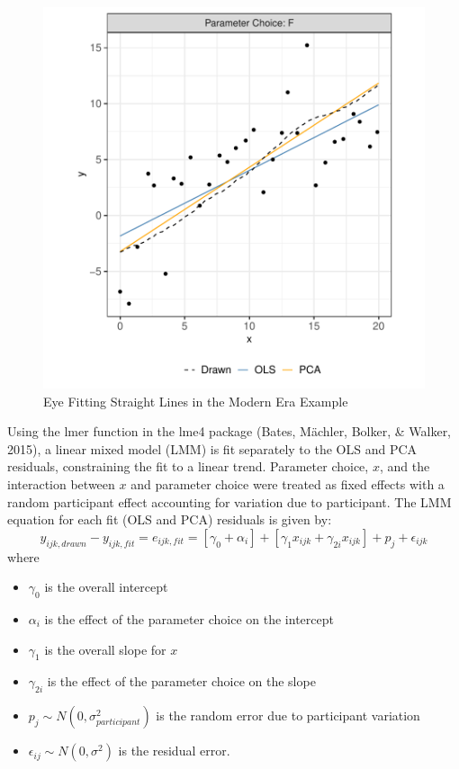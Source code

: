\documentclass[print]{nuthesis}
\providecommand{\tightlist}{%
  \setlength{\itemsep}{0pt}\setlength{\parskip}{0pt}}
\begin{document}
\begin{figure}[tbp]

{\centering \includegraphics[width=0.65\linewidth,]{thesis_files/figure-latex/eyefitting-example-plot-1} 

}

\caption{Eye Fitting Straight Lines in the Modern Era Example}\label{fig:eyefitting-example-plot}
\end{figure}

Using the lmer function in the lme4 package (Bates, Mächler, Bolker, \& Walker, 2015), a linear mixed model (LMM) is fit separately to the OLS and PCA residuals, constraining the fit to a linear trend.
Parameter choice, \(x\), and the interaction between \(x\) and parameter choice were treated as fixed effects with a random participant effect accounting for variation due to participant.
The LMM equation for each fit (OLS and PCA) residuals is given by:
\begin{equation}
y_{ijk,drawn} - y_{ijk,fit} = e_{ijk,fit} = \left[\gamma_0 + \alpha_i\right] + \left[\gamma_{1} x_{ijk} + \gamma_{2i} x_{ijk}\right] + p_{j} + \epsilon_{ijk}
\end{equation}
\noindent where

\begin{itemize}
\tightlist
\item
  \(\gamma_0\) is the overall intercept
\item
  \(\alpha_i\) is the effect of the parameter choice on the intercept
\item
  \(\gamma_1\) is the overall slope for \(x\)
\item
  \(\gamma_{2i}\) is the effect of the parameter choice on the slope
\item
  \(p_{j} \sim N(0, \sigma^2_{participant})\) is the random error due to participant variation
\item
  \(\epsilon_{ij} \sim N(0, \sigma^2)\) is the residual error.
\end{itemize}
\end{document}
